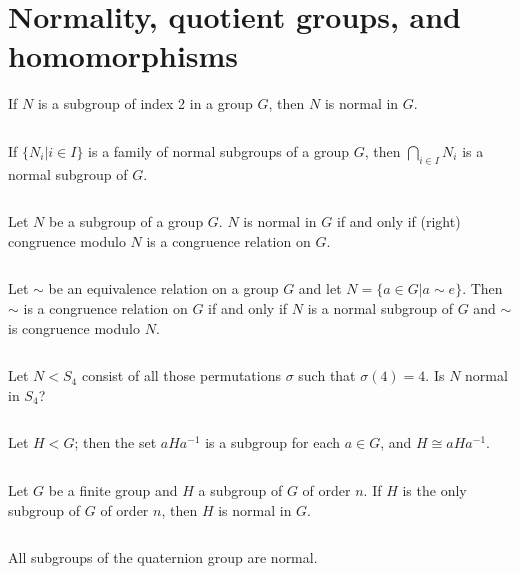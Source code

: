 \section{Normality, quotient groups, and homomorphisms}
\begin{ex}
    If $N$ is a subgroup of index 2 in a group $G$, then $N$ is normal in $G$.
\end{ex}

$$ $$

\begin{ex}
    If $\{N_{i}|i\in I\}$ is a family of normal subgroups of a group $G$, then $\bigcap\limits_{i\in I}N_{i}$ is a normal subgroup of $G$.
\end{ex}

$$ $$

\begin{ex}
    Let $N$ be a subgroup of a group $G$. $N$ is normal in $G$ if and only if (right) congruence modulo $N$ is a congruence relation on $G$.
\end{ex}

$$ $$

\begin{ex}
    Let $\sim$ be an equivalence relation on a group $G$ and let $N=\{a\in G |a\sim e\}$. Then $\sim$ is a congruence relation on $G$ if and only if $N$ is a normal subgroup of $G$ and $\sim$ is congruence modulo $N$.
\end{ex}

$$ $$

\begin{ex}
    Let $N<S_{4}$ consist of all those permutations $\sigma$ such that $\sigma(4)=4$. Is $N$ normal in $S_{4}$?
\end{ex}

$$ $$

\begin{ex}
    Let $H<G$; then the set $aHa^{-1}$ is a subgroup for each $a\in G$, and $H\cong aHa^{-1}$. 
\end{ex}

$$ $$

\begin{ex}
    Let $G$ be a finite group and $H$ a subgroup of $G$ of order $n$. If $H$ is the only subgroup of $G$ of order $n$, then $H$ is normal in $G$.
\end{ex}

$$ $$

\begin{ex}
    All subgroups of the quaternion group are normal.
\end{ex}

